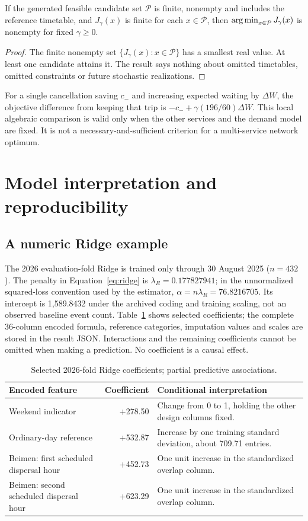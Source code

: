 \begin{proposition}
If the generated feasible candidate set $\mathcal P$ is finite, nonempty and includes the reference timetable, and $J_\gamma(x)$ is finite for each $x\in\mathcal P$, then $\operatorname*{arg\,min}_{x\in\mathcal P}J_\gamma(x)$ is nonempty for fixed $\gamma\geq0$.
\end{proposition}
\begin{proof}
The finite nonempty set $\{J_\gamma(x):x\in\mathcal P\}$ has a smallest real value. At least one candidate attains it. The result says nothing about omitted timetables, omitted constraints or future stochastic realizations.
\end{proof}
For a single cancellation saving $c_-$ and increasing expected waiting by $\Delta W$, the objective difference from keeping that trip is $-c_-+\gamma(196/60)\Delta W$. This local algebraic comparison is valid only when the other services and the demand model are fixed. It is not a necessary-and-sufficient criterion for a multi-service network optimum.

\section{Model interpretation and reproducibility}
\subsection{A numeric Ridge example}
The 2026 evaluation-fold Ridge is trained only through 30 August 2025 ($n=432$). The penalty in Equation~\eqref{eq:ridge} is $\lambda_R=0.177827941$; in the unnormalized squared-loss convention used by the estimator, $\alpha=n\lambda_R=76.8216705$. Its intercept is 1,589.8432 under the archived coding and training scaling, not an observed baseline event count. Table~\ref{tab:ridgecoeff} shows selected coefficients; the complete 36-column encoded formula, reference categories, imputation values and scales are stored in the result JSON. Interactions and the remaining coefficients cannot be omitted when making a prediction. No coefficient is a causal effect.
\begin{table}[htbp]\centering\small
\caption{Selected 2026-fold Ridge coefficients; partial predictive associations.}
\label{tab:ridgecoeff}
\begin{tabularx}{\linewidth}{p{49mm}rX}\toprule
Encoded feature & Coefficient & Conditional interpretation\\\midrule
Weekend indicator & +278.50 & Change from 0 to 1, holding the other design columns fixed.\\
Ordinary-day reference & +532.87 & Increase by one training standard deviation, about 709.71 entries.\\
Beimen: first scheduled dispersal hour & +452.73 & One unit increase in the standardized overlap column.\\
Beimen: second scheduled dispersal hour & +623.29 & One unit increase in the standardized overlap column.\\\bottomrule
\end{tabularx}
\end{table}

